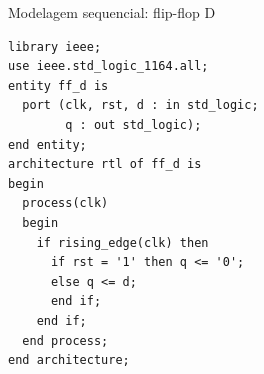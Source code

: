 \begin{frame}[fragile,t]{Modelagem sequencial: flip-flop D}
\begin{lstlisting}
library ieee;
use ieee.std_logic_1164.all;
entity ff_d is
  port (clk, rst, d : in std_logic;
        q : out std_logic);
end entity;
architecture rtl of ff_d is
begin
  process(clk)
  begin
    if rising_edge(clk) then
      if rst = '1' then q <= '0';
      else q <= d;
      end if;
    end if;
  end process;
end architecture;
\end{lstlisting}
\end{frame}
